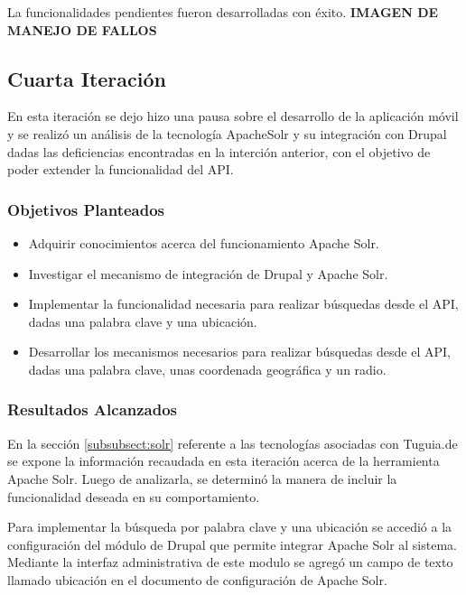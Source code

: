 La funcionalidades pendientes fueron desarrolladas con éxito. 
  \textbf{IMAGEN DE MANEJO DE FALLOS}

\subsection{Cuarta Iteración}

En esta iteración se dejo hizo una pausa sobre el desarrollo de la aplicación móvil y se realizó un análisis de la tecnología ApacheSolr y su integración con Drupal dadas las deficiencias encontradas en la interción anterior, con el objetivo de poder extender la funcionalidad del API. 

\subsubsection{Objetivos Planteados} 
\begin{itemize}

\item Adquirir conocimientos acerca del funcionamiento Apache Solr.
\item Investigar el mecanismo de integración de Drupal y Apache Solr.
\item Implementar la funcionalidad necesaria para realizar búsquedas desde el API, dadas una palabra clave y una ubicación.
\item Desarrollar los mecanismos necesarios para realizar búsquedas desde el API, dadas una palabra clave, unas coordenada geográfica y un radio.

\end{itemize}

\subsubsection{Resultados Alcanzados}

En la sección \ref{subsubsect:solr} referente a las tecnologías asociadas con Tuguia.de se expone la información recaudada en esta iteración acerca de la herramienta Apache Solr. Luego de analizarla, se determinó la manera de incluir la funcionalidad deseada en su comportamiento.

Para implementar la búsqueda por palabra clave y una ubicación se accedió a la configuración del módulo de Drupal que permite integrar Apache Solr al sistema. Mediante la interfaz administrativa de este modulo se agregó un campo de texto llamado ubicación en el documento de configuración de Apache Solr. 


